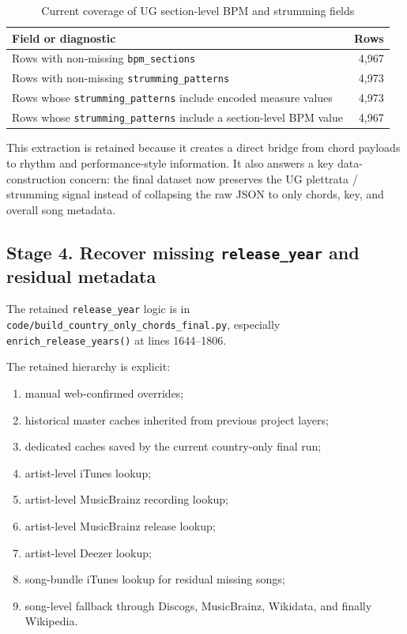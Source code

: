 \documentclass[11pt]{article}
\begin{document}
\begin{table}[H]
\centering
\caption{Current coverage of UG section-level BPM and strumming fields}
\begin{tabularx}{\textwidth}{Y r}
\toprule
Field or diagnostic & Rows \\
\midrule
Rows with non-missing \texttt{bpm\_sections} & 4,967 \\
Rows with non-missing \texttt{strumming\_patterns} & 4,973 \\
Rows whose \texttt{strumming\_patterns} include encoded measure values & 4,973 \\
Rows whose \texttt{strumming\_patterns} include a section-level BPM value & 4,967 \\
\bottomrule
\end{tabularx}
\end{table}

This extraction is retained because it creates a direct bridge from chord
payloads to rhythm and performance-style information. It also answers a key
data-construction concern: the final dataset now preserves the UG plettrata /
strumming signal instead of collapsing the raw JSON to only chords, key, and
overall song metadata.

\subsection{Stage 4. Recover missing \texttt{release\_year} and residual metadata}
The retained \texttt{release\_year} logic is in
\texttt{code/build\_country\_only\_chords\_final.py}, especially
\texttt{enrich\_release\_years()} at lines 1644--1806.

The retained hierarchy is explicit:
\begin{enumerate}[leftmargin=2em]
\item manual web-confirmed overrides;
\item historical master caches inherited from previous project layers;
\item dedicated caches saved by the current country-only final run;
\item artist-level iTunes lookup;
\item artist-level MusicBrainz recording lookup;
\item artist-level MusicBrainz release lookup;
\item artist-level Deezer lookup;
\item song-bundle iTunes lookup for residual missing songs;
\item song-level fallback through Discogs, MusicBrainz, Wikidata, and finally
Wikipedia.
\end{enumerate}
\end{document}
